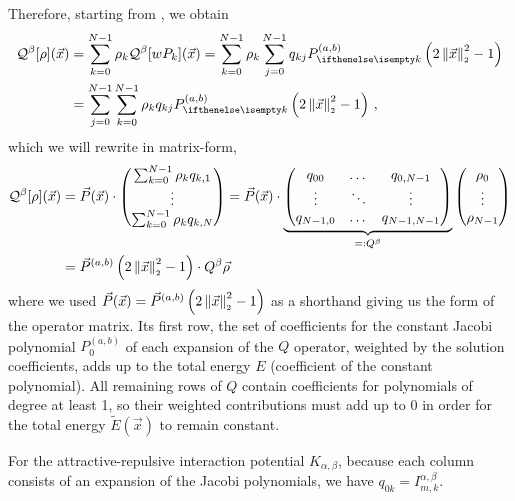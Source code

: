 Therefore, starting from , we obtain
\begin{align*}
  \mathcal{Q}^\beta[\rho](\vec{x}) & = \sum_{k=0}^{N-1} \rho_k \mathcal{Q}^\beta[wP_k](\vec{x}) = \sum_{k=0}^{N-1} \rho_k \sum_{j=0}^{N-1} q_{kj} \jacobi{x} \\
                                   & = \sum_{j=0}^{N-1} \sum_{k=0}^{N-1} \rho_k q_{kj} \jacobi{x}\,,
\end{align*}
which we will rewrite in matrix-form,
\begin{align*}
  \mathcal{Q}^\beta[\rho](\vec{x}) & = \vec{P}(\vec{x}) \cdot
  \begin{pmatrix}
    \sum_{k=0}^{N-1} \rho_k q_{k,1} \\
    \vdots                          \\
    \sum_{k=0}^{N-1} \rho_k q_{k,N}
  \end{pmatrix} = \vec{P}(\vec{x}) \cdot
  \underbrace{
    \begin{pmatrix}
      q_{00}    & \dots  & q_{0,N-1}   \\
      \vdots    & \ddots & \vdots      \\
      q_{N-1,0} & \dots  & q_{N-1,N-1} \\
    \end{pmatrix}
  }_{=: Q^\beta}
  \begin{pmatrix}
    \rho_0 \\
    \vdots \\
    \rho_{N-1}
  \end{pmatrix}                                                              \\
                                   & = \vec{P}^{(a, b)}\left(2 \left\lVert\vec{x}\right\rVert_{\scriptscriptstyle 2}^2 - 1\right) \cdot Q^\beta \vec{\rho}
\end{align*}
where we used $\vec{P}(\vec{x}) = \vec{P}^{(a, b)}\left(2 \left\lVert\vec{x}\right\rVert_{\scriptscriptstyle 2}^2 - 1\right)$ as a shorthand giving us the form of the operator matrix.
Its first row, the set of coefficients for the constant Jacobi polynomial $P_0^{(a,b)}$ of each expansion of the $Q$ operator, weighted by the solution coefficients, adds up to the total energy $E$ (coefficient of the constant polynomial).
All remaining rows of $Q$ contain coefficients for polynomials of degree at least 1, so their weighted contributions must add up to 0 in order for the total energy $\tilde{E}(\vec{x})$ to remain constant.

For the attractive-repulsive interaction potential $K_{\alpha,\beta}$, because each column consists of an expansion of the Jacobi polynomials, we have $q_{0k} = I_{m,k}^{\alpha,\beta}$.

